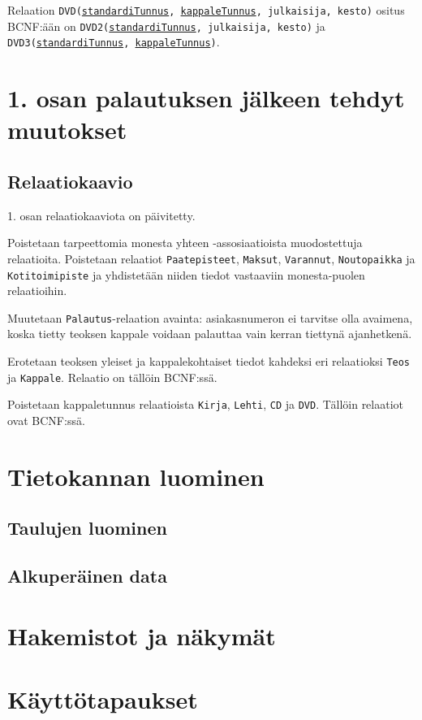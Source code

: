 \documentclass[12pt,titlepage] {article}
\begin{document}
Relaation \texttt{DVD(\underline{standardiTunnus}, \underline{kappaleTunnus}, julkaisija, kesto)} ositus BCNF:ään on \texttt{DVD2(\underline{standardiTunnus}, julkaisija, kesto)} ja \texttt{DVD3(\underline{standardiTunnus}, \underline{kappaleTunnus})}.

\section {1. osan palautuksen jälkeen tehdyt muutokset}

\subsection {Relaatiokaavio}

1. osan relaatiokaaviota on päivitetty.

Poistetaan tarpeettomia monesta yhteen -assosiaatioista muodostettuja relaatioita. Poistetaan relaatiot \texttt{Paatepisteet}, \texttt{Maksut}, \texttt{Varannut}, \texttt{Noutopaikka} ja \texttt{Kotitoimipiste} ja yhdistetään niiden tiedot vastaaviin monesta-puolen relaatioihin.

Muutetaan \texttt{Palautus}-relaation avainta: asiakasnumeron ei tarvitse olla avaimena, koska tietty teoksen kappale voidaan palauttaa vain kerran tiettynä ajanhetkenä.

Erotetaan teoksen yleiset ja kappalekohtaiset tiedot kahdeksi eri relaatioksi \texttt{Teos} ja \texttt{Kappale}. Relaatio on tällöin BCNF:ssä.

Poistetaan kappaletunnus relaatioista \texttt{Kirja}, \texttt{Lehti}, \texttt{CD} ja \texttt{DVD}. Tällöin relaatiot ovat BCNF:ssä.

\section {Tietokannan luominen}

\subsection {Taulujen luominen}



\subsection {Alkuperäinen data}



\section {Hakemistot ja näkymät}



\section {Käyttötapaukset}


\end{document}
